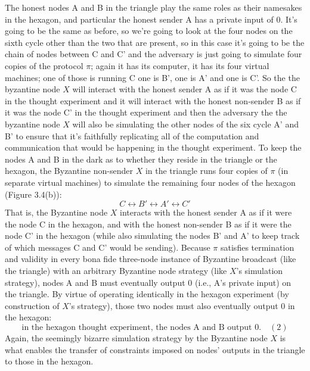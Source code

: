 The honest nodes A and B in the triangle play the same roles as their namesakes in the
hexagon, and particular the honest sender A has a private input of 0. 
It's going to be the same as before, so we're going to look at the four nodes on the sixth cycle other than the two that are present, so in this case
it's going to be the chain of nodes between C and C' and the adversary is just going to simulate four copies
of the protocol $\pi$; again it has its computer, it has its four virtual machines; one of those is
running C one is B', one is A' and one is C'. So the the byzantine node $X$ will interact with the honest sender A as
if it was the node C in the thought experiment and it will interact with the honest non-sender B as
if it was the node C' in the thought experiment and then the adversary the the byzantine node $X$ will also be simulating the other nodes of the six cycle A' and B' to ensure that it's faithfully
replicating all of the computation and communication that would be happening in the thought experiment.
To keep the nodes A
and B in the dark as to whether they reside in the triangle or the hexagon, the Byzantine
non-sender $X$ in the triangle runs four copies of $\pi$ (in separate virtual machines) to simulate
the remaining four nodes of the hexagon (Figure 3.4(b)):
$$C \leftrightarrow B' \leftrightarrow A' \leftrightarrow C'$$
That is, the Byzantine node $X$ interacts with the honest sender A as if it were the node C
in the hexagon, and with the honest non-sender B as if it were the node C' in the hexagon
(while also simulating the nodes B' and A' to keep track of which messages C and C'  would
be sending). Because $\pi$ satisfies termination and validity in every bona fide three-node instance of
Byzantine broadcast (like the triangle) with an arbitrary Byzantine node strategy (like $X$’s
simulation strategy), nodes A and B must eventually output 0 (i.e., A’s private input) on
the triangle. By virtue of operating identically in the hexagon experiment (by construction
of $X$’s strategy), those two nodes must also eventually output 0 in the hexagon:
$$\text{in the hexagon thought experiment, the nodes A and B output 0.} \quad (2)$$
Again, the seemingly bizarre simulation strategy by the Byzantine node $X$ is what enables
the transfer of constraints imposed on nodes’ outputs in the triangle to those in the hexagon.


